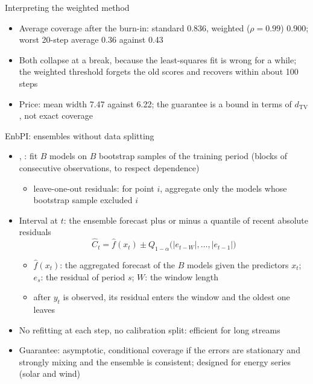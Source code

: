 \begin{frame}{Interpreting the weighted method}
\itemsize{\small}
\begin{itemize}
    \item Average coverage after the burn-in: standard 0.836, weighted ($\rho = 0.99$) 0.900; worst 20-step average 0.36 against 0.43
    \item Both collapse at a break, because the least-squares fit is wrong for a while; the weighted threshold forgets the old scores and recovers within about 100 steps
    \item Price: mean width 7.47 against 6.22; the guarantee is a bound in terms of $d_{\mathrm{TV}}$, not exact coverage
\end{itemize}
\end{frame}

\begin{frame}{EnbPI: ensembles without data splitting}
\itemsize{\small}
\begin{itemize}
    \item {}, : fit $B$ models on $B$ bootstrap samples of the training period (blocks of consecutive observations, to respect dependence)
    \begin{itemize}
        \item leave-one-out residuals: for point $i$, aggregate only the models whose bootstrap sample excluded $i$
    \end{itemize}
    \item Interval at $t$: the ensemble forecast plus or minus a quantile of recent absolute residuals \[ \hat C_t = \hat f(x_t) \pm Q_{1-\alpha}\big(|e_{t-W}|, \dots, |e_{t-1}|\big) \]
    \begin{itemize}
        \item $\hat f(x_t)$: the aggregated forecast of the $B$ models given the predictors $x_t$; $e_s$: the residual of period $s$; $W$: the window length
        \item after $y_t$ is observed, its residual enters the window and the oldest one leaves
    \end{itemize}
    \item No refitting at each step, no calibration split: efficient for long streams
    \item Guarantee: asymptotic, conditional coverage if the errors are stationary and strongly mixing and the ensemble is consistent; designed for energy series (solar and wind)
\end{itemize}
\end{frame}

